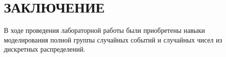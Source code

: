 \section*{ЗАКЛЮЧЕНИЕ}

В ходе проведения лабораторной работы были приобретены навыки моделирования полной группы случайных событий и случайных чисел из дискретных распределений.

\newpage
